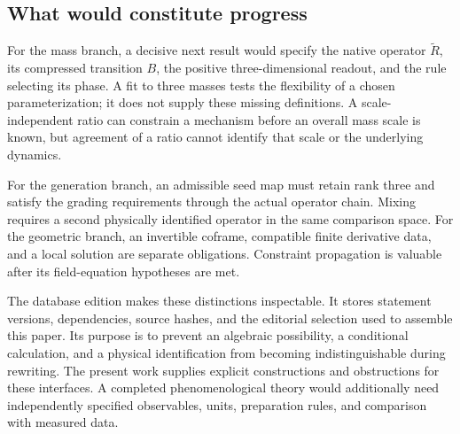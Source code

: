 \subsection{What would constitute progress}

For the mass branch, a decisive next result would specify the native
operator $\widetilde R$, its compressed transition $B$, the positive
three-dimensional readout, and the rule selecting its phase. A fit
to three masses tests the flexibility of a chosen parameterization;
it does not supply these missing definitions. A scale-independent
ratio can constrain a mechanism before an overall mass scale is
known, but agreement of a ratio cannot identify that scale or the
underlying dynamics.

For the generation branch, an admissible seed map must retain rank
three and satisfy the grading requirements through the actual
operator chain. Mixing requires a second physically identified
operator in the same comparison space. For the geometric branch,
an invertible coframe, compatible finite derivative data, and a
local solution are separate obligations. Constraint propagation is
valuable after its field-equation hypotheses are met.

The database edition makes these distinctions inspectable. It
stores statement versions, dependencies, source hashes, and the
editorial selection used to assemble this paper. Its purpose is to
prevent an algebraic possibility, a conditional calculation, and
a physical identification from becoming indistinguishable during
rewriting. The present work supplies explicit constructions and
obstructions for these interfaces. A completed phenomenological
theory would additionally need independently specified observables,
units, preparation rules, and comparison with measured data.
